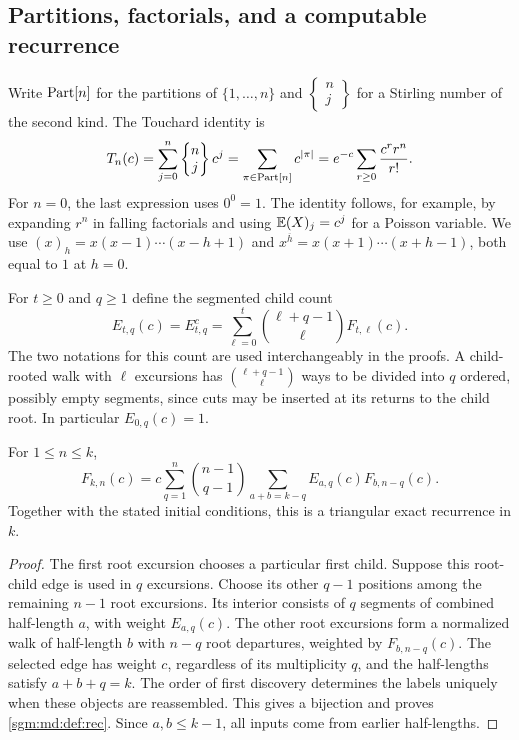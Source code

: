 \documentclass[11pt,letterpaper]{article}
\theoremstyle{remark}\newtheorem{remark}[theorem]{Remark}
\newcommand{\fall}[2]{(#1)_{#2}}\newcommand{\rise}[2]{#1^{\overline{#2}}}
\newcommand{\Stir}[2]{\left\{\begin{matrix}#1\\#2\end{matrix}\right\}}
\theoremstyle{definition}\newtheorem{definition}[theorem]{Definition}
\begin{document}
\subsection{Partitions, factorials, and a computable recurrence}

Write $\operatorname{Part}[n]$ for the partitions of $\{1,\ldots,n\}$ and
$\Stir{n}{j}$ for a Stirling number of the second kind. The Touchard
identity is
\begin{equation}\label{sgm:md:def:Touchard}
 T_n(c)=\sum_{j=0}^n\Stir{n}{j}c^j
       =\sum_{\pi\in\Part[n]}c^{|\pi|}
       =e^{-c}\sum_{r\ge0}\frac{c^rr^n}{r!}.
\end{equation}
For $n=0$, the last expression uses $0^0=1$. The identity follows,
for example, by expanding $r^n$ in falling factorials and using
$\E\fall{X}{j}=c^j$ for a Poisson variable. We use
$\fall{x}{h}=x(x-1)\cdots(x-h+1)$ and
$\rise{x}{h}=x(x+1)\cdots(x+h-1)$, both equal to $1$ at $h=0$.

For $t\ge0$ and $q\ge1$ define the segmented child count
\begin{equation}\label{sgm:md:def:child}
 E_{t,q}(c)=E^c_{t,q}
   =\sum_{\ell=0}^t\binom{\ell+q-1}{\ell}F_{t,\ell}(c).
\end{equation}
The two notations for this count are used interchangeably in the
proofs. A child-rooted walk with $\ell$ excursions has
$\binom{\ell+q-1}{\ell}$ ways to be divided into $q$ ordered,
possibly empty segments, since cuts may be inserted at its returns
to the child root. In particular $E_{0,q}(c)=1$.

\begin{proposition}\label{sgm:md:def:recurrence}
For $1\le n\le k$,
\begin{equation}\label{sgm:md:def:rec}
 F_{k,n}(c)
 =c\sum_{q=1}^n\binom{n-1}{q-1}
      \sum_{a+b=k-q}E_{a,q}(c)F_{b,n-q}(c).
\end{equation}
Together with the stated initial conditions, this is a triangular
exact recurrence in $k$.
\end{proposition}
\begin{proof}
The first root excursion chooses a particular first child. Suppose
this root-child edge is used in $q$ excursions. Choose its other
$q-1$ positions among the remaining $n-1$ root excursions. Its
interior consists of $q$ segments of combined half-length $a$, with
weight $E_{a,q}(c)$. The other root excursions form a normalized walk
of half-length $b$ with $n-q$ root departures, weighted by
$F_{b,n-q}(c)$. The selected edge has weight $c$, regardless of its
multiplicity $q$, and the half-lengths satisfy $a+b+q=k$.
The order of first discovery determines the labels uniquely when
these objects are reassembled. This gives a bijection and proves
\eqref{sgm:md:def:rec}. Since $a,b\le k-1$, all inputs come from earlier
half-lengths.
\end{proof}
\end{document}
